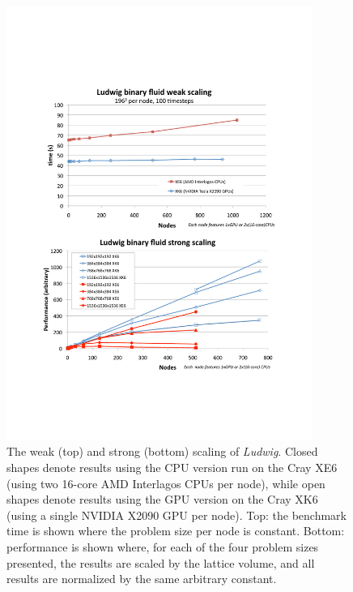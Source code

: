 \begin{figure}[!t]
\centering
\includegraphics[width=10cm]{Chapters/chapter14/figures/two_graphs_ud}
\caption[Scaling of Ludwig to many GPUs in parallel.]{The weak (top)
  and strong (bottom) scaling of \textit{Ludwig}.  Closed shapes
  denote results using the CPU version run on the Cray XE6 (using two
  16-core AMD Interlagos CPUs per node), while open shapes denote
  results using the GPU version on the Cray XK6 (using a single NVIDIA
  X2090 GPU per node). Top: the benchmark time is shown where the
  problem size per node is constant. Bottom: performance is shown
  where, for each of the four problem sizes presented, the results are
  scaled by the lattice volume, and all results are normalized by the
  same arbitrary constant.  }
\label{ch14:fig:scaling}
\end{figure}



